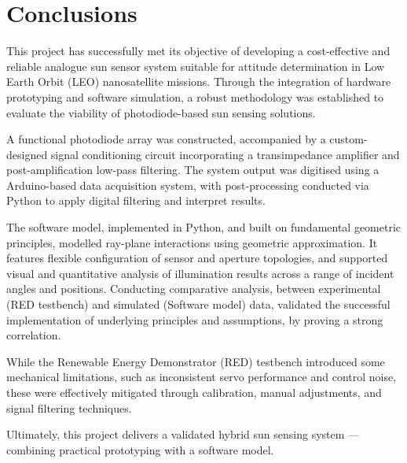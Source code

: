 \chapter{Conclusions}

This project has successfully met its objective of developing a cost-effective and reliable analogue sun sensor system suitable for attitude determination in Low Earth Orbit (LEO) nanosatellite missions. Through the integration of hardware prototyping and software simulation, a robust methodology was established to evaluate the viability of photodiode-based sun sensing solutions.

A functional photodiode array was constructed, accompanied by a custom-designed signal conditioning circuit incorporating a transimpedance amplifier and post-amplification low-pass filtering. The system output was digitised using a Arduino-based data acquisition system, with post-processing conducted via Python to apply digital filtering and interpret results.

The software model, implemented in Python, and built on fundamental geometric principles, modelled ray-plane interactions using geometric approximation.  It features flexible configuration of sensor and aperture topologies, and supported visual and quantitative analysis of illumination results across a range of incident angles and positions. Conducting comparative analysis, between experimental (RED testbench) and simulated (Software model) data, validated the successful implementation of underlying principles and assumptions, by proving a strong correlation.

While the Renewable Energy Demonstrator (RED) testbench introduced some mechanical limitations, such as inconsistent servo performance and control noise, these were effectively mitigated through calibration, manual adjustments, and signal filtering techniques.

Ultimately, this project delivers a validated hybrid sun sensing system — combining practical prototyping with a software model.
  